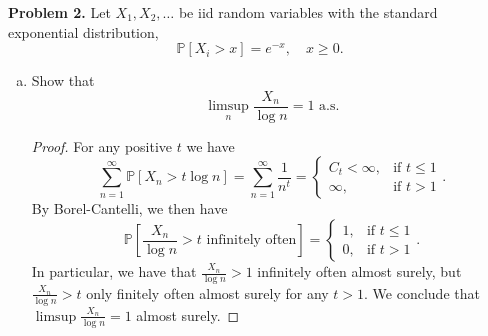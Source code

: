 \documentclass[11pt,letterpaper]{report}
\newcommand{\Prob}{\mathbb{P}}
\begin{document}
\noindent\textbf{Problem 2. }
Let $X_1, X_2, \ldots$ be iid random variables with the standard exponential distribution,
\[
\Prob[X_i>x] = e^{-x},\quad x\geq 0.
\]
\begin{enumerate}[(a)]
	\item Show that
	\[
	\limsup_n \frac{X_n}{\log n} = 1\text{ a.s.}
	\]
	\begin{proof}
		For any positive $t$ we have
		\[
		\sum_{n=1}^\infty \Prob[X_n > t\log n] = \sum_{n=1}^\infty \frac{1}{n^t} = \begin{cases}
			C_t<\infty,&\text{if }t\leq 1\\
			\infty,&\text{if }t>1
		\end{cases}.
		\]
		By Borel-Cantelli, we then have
		\[
		\Prob\left[\frac{X_n}{\log n}>t\text{ infinitely often}\right] = \begin{cases}
			1,&\text{if }t\leq 1\\
			0,&\text{if }t>1
		\end{cases}.
		\]
		In particular, we have that $\frac{X_n}{\log n} > 1$ infinitely often almost surely, but $\frac{X_n}{\log n}>t$ only finitely often almost surely for any $t>1$. We conclude that $\limsup \frac{X_n}{\log n} = 1$ almost surely.
	\end{proof}


\end{enumerate}
\end{document}
